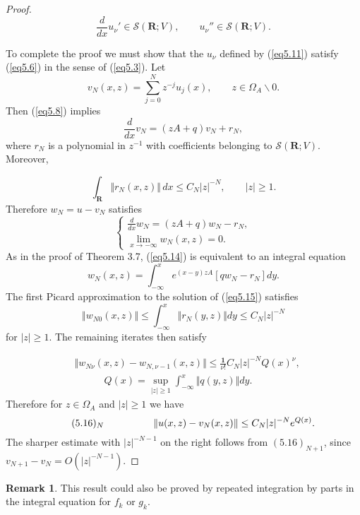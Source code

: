 \documentclass{surv-l}
\theoremstyle{plain}
\theoremstyle{definition}
\newtheorem{remark}[theorem]{Remark}
\numberwithin{equation}{chapter}
\begin{document}
\begin{proof}
\begin{equation}\label{eq5.12}
\frac{d}{dx}u_{\nu}'\in \mathscr{S}(\mathbf{R};V),\qquad u_{\nu}''\in \mathscr{S}(\mathbf{R}; V).
\end{equation}

To complete the proof we must show that the $u_{\nu}$ defined by (\ref{eq5.11}) satisfy (\ref{eq5.6}) in the sense of (\ref{eq5.3}). Let
\begin{equation*}
v_{N}(x, z)=\sum_{j=0}^{N}z^{-j}u_{j}(x),\qquad z\in\Omega_{A}\backslash 0.
\end{equation*}
Then (\ref{eq5.8}) implies
\begin{equation*}
\frac{d}{dx}v_{N}=(zA+q)v_{N}+r_{N},
\end{equation*}
where $r_{N}$ is a polynomial in $z^{-1}$ with coefficients belonging to $\mathscr{S}(\mathbf{R};V)$. Moreover,

\begin{equation}\label{eq5.13}
\int_{\mathbf{R}}\Vert r_{N}(x,z)\Vert\, dx\leq C_{N}|z|^{-N},\qquad |z|\geq 1.
\end{equation}
Therefore $w_{N}=u-v_{N}$ satisfies
\begin{equation}\label{eq5.14}
\left\{\begin{array}{l}
\frac{d}{dx}w_{N}=(zA+q)w_{N}-r_{N},\\
\lim_{x\rightarrow-\infty}w_{N}(x, z)=0.
\end{array}\right.
\end{equation}
As in the proof of Theorem 3.7, (\ref{eq5.14}) is equivalent to an integral equation
\begin{equation}\label{eq5.15}
w_{N}(x, z)=\int_{-\infty}^{x}e^{(x-y)zA}[qw_{N}-r_{N}]dy.
\end{equation}
The first Picard approximation to the solution of (\ref{eq5.15}) satisfies
\begin{equation*}
\Vert w_{N0}(x, z)\Vert\leq\int_{-\infty}^{x}\Vert r_{N}(y, z)\Vert dy\leq C_{N}|z|^{-N}
\end{equation*}
for $|z|\geq 1$. The remaining iterates then satisfy

\begin{align*}
&\Vert w_{N\nu}(x, z)-w_{N,\nu-1}(x, z)\Vert\leq\frac{\mathbf{1}}{\nu!}C_{N}|z|^{-N}Q(x)^{\nu},\\
&\qquad\quad Q(x)=\sup_{|z|\geq 1}\int_{-\infty}^{x}\Vert q(y, z)\Vert dy.
\end{align*}
Therefore for $z\in\Omega_{A}$ and $|z|\geq 1$ we have
\begin{equation*}
\tag*{$(5.16)_{N}$} \qquad \qquad \quad \Vert u(x,z)-v_{N}(x, z)\Vert\leq C_{N}|z|^{-N}e^{Q(x)}.
\end{equation*}
The sharper estimate with $|z|^{-N-1}$ on the right follows from $(5.16)_{N+1}$, since $v_{N+1}-v_{N}=O(|z|^{-N-1})$.
\end{proof}
\setcounter{theorem}{16}
\begin{remark}\label{chap01:rem5.17}
This result could also be proved by repeated integration by parts in the integral equation for $f_{k}$ or $g_{k}$.
\end{remark}
\end{document}
